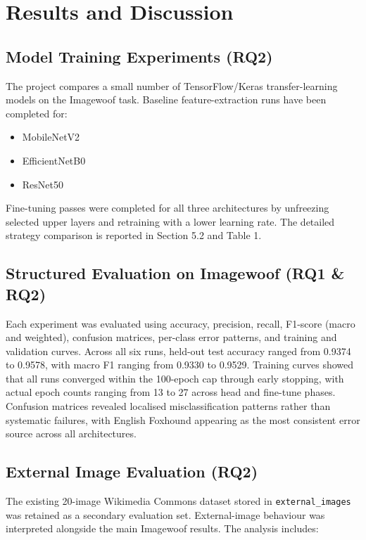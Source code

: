 \documentclass[12pt, a4paper]{article}
\begin{document}
\section{Results and Discussion}

\subsection{Model Training Experiments (RQ2)}

The project compares a small number of TensorFlow/Keras transfer-learning models on the Imagewoof task. Baseline feature-extraction runs have been completed for:

\begin{itemize}
  \item MobileNetV2
  \item EfficientNetB0
  \item ResNet50
\end{itemize}

Fine-tuning passes were completed for all three architectures by unfreezing selected upper layers and retraining with a lower learning rate. The detailed strategy comparison is reported in Section 5.2 and Table 1.

\subsection{Structured Evaluation on Imagewoof (RQ1 \& RQ2)}

Each experiment was evaluated using accuracy, precision, recall, F1-score (macro and weighted), confusion matrices, per-class error patterns, and training and validation curves. Across all six runs, held-out test accuracy ranged from 0.9374 to 0.9578, with macro F1 ranging from 0.9330 to 0.9529. Training curves showed that all runs converged within the 100-epoch cap through early stopping, with actual epoch counts ranging from 13 to 27 across head and fine-tune phases. Confusion matrices revealed localised misclassification patterns rather than systematic failures, with English Foxhound appearing as the most consistent error source across all architectures.

\subsection{External Image Evaluation (RQ2)}

The existing 20-image Wikimedia Commons dataset stored in \texttt{external\_images} was retained as a secondary evaluation set. External-image behaviour was interpreted alongside the main Imagewoof results. The analysis includes:
\end{document}

